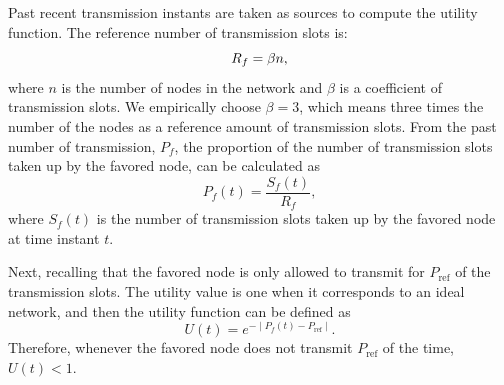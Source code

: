\documentclass[journal]{IEEEtran}  %
\begin{document}
Past recent transmission instants are taken as sources to compute the utility
function.
The reference number of transmission slots is:
\begin{equation}
\centering
R_f = \beta n,
\label{equ:R_f}
\end{equation}
where $n$ is the number of nodes in the network and $\beta$ is a coefficient
  of transmission slots.  We empirically choose $\beta=3$,
which means three times the number of the nodes as a reference amount
of transmission slots. 
From the past number of transmission, $P_{f}$, the proportion of the number of
transmission slots taken up by the favored node, can be calculated as
\begin{equation}
P_{f}(t)=\frac{S_{f}(t)}{R_f},
\label{equ:P_f}
\end{equation}
where $S_{f}(t)$ is the number of transmission slots taken up by the favored
  node at time instant $t$.

Next, recalling that the favored node is only allowed to transmit for
$P_{\text{ref}}$ of the transmission slots.
The utility value is one when it corresponds to an ideal network, 
and then the utility function %
can be defined as
\begin{equation}
U(t)= e^{-\mid P_{f}(t) - P_{\text{ref}}\mid}.
\end{equation}
Therefore, whenever the favored node does not transmit $P_{\text{ref}}$ of the
  time, $U(t)<1$.
\end{document}
